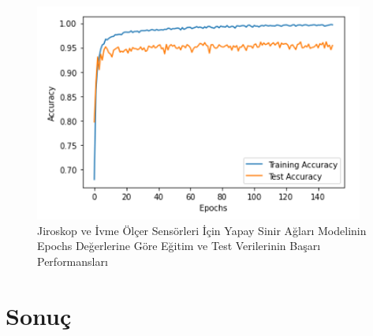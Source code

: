 \documentclass[12pt,twoside]{deuthesis}
\begin{document}
\begin{figure}

{\centering \includegraphics[width=0.6\linewidth,height=0.25\textheight]{figure/jiysa_testtrain} 

}

\caption{Jiroskop ve İvme Ölçer Sensörleri İçin Yapay Sinir Ağları Modelinin Epochs Değerlerine Göre Eğitim ve Test Verilerinin Başarı Performansları}\label{fig:jiysatesttrain}
\end{figure}
\hypertarget{red-labels}{%
\chapter{Sonuç}\label{red-labels}}
\end{document}
